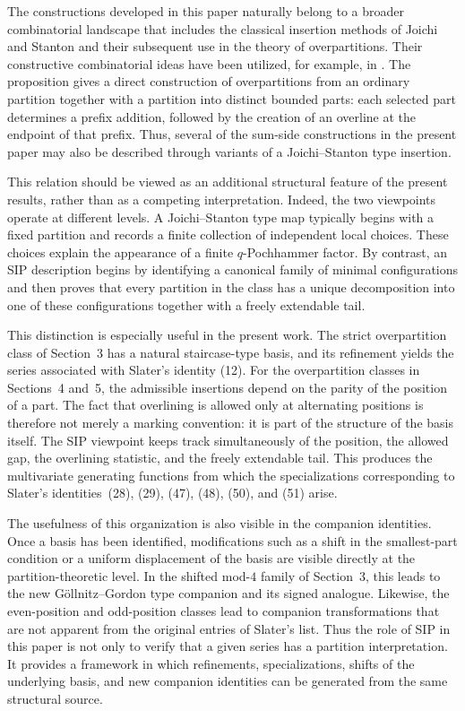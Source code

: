 \documentclass[11pt]{amsart}
\theoremstyle{definition}
\theoremstyle{remark}
\numberwithin{equation}{section}
\begin{document}
The constructions developed in this paper naturally belong to a broader combinatorial landscape that includes the classical insertion methods of Joichi and Stanton \cite{JoichiStanton1987} and their subsequent use in the theory of overpartitions. Their constructive combinatorial ideas have been utilized, for example, in \cite[Proposition~2.1]{overpartitions}. The proposition gives a direct construction of overpartitions from an ordinary partition together with a partition into distinct bounded parts: each selected part determines a prefix addition, followed by the creation of an overline at the endpoint of that prefix. Thus, several of the sum-side constructions in the present paper may also be described through variants of a Joichi--Stanton type insertion.

This relation should be viewed as an additional structural feature of the present results, rather than as a competing interpretation. Indeed, the two viewpoints operate at different levels. A Joichi--Stanton type map typically begins with a fixed partition and records a finite collection of independent local choices. These choices explain the appearance of a finite $q$-Pochhammer factor. By contrast, an SIP description begins by identifying a canonical family of minimal configurations and then proves that every partition in the class has a unique decomposition into one of these configurations together with a freely extendable tail.

This distinction is especially useful in the present work. The strict overpartition class of Section~3 has a natural staircase-type basis, and its refinement yields the series associated with Slater's identity (12). For the overpartition classes in Sections~4 and~5, the admissible insertions depend on the parity of the position of a part.  The fact that overlining is allowed only at alternating positions is therefore not merely a marking convention: it is part of the structure of the basis itself. The SIP viewpoint keeps track simultaneously of the position, the allowed gap, the overlining statistic, and the freely extendable tail. This produces the multivariate generating functions from which the specializations corresponding to Slater's identities~(28), (29), (47), (48), (50), and (51) arise.

The usefulness of this organization is also visible in the companion identities.  Once a basis has been identified, modifications such as a shift in the smallest-part condition or a uniform displacement of the basis are visible directly at the partition-theoretic level. In the shifted mod-$4$ family of Section~3, this leads to the new G\"ollnitz--Gordon type companion and its signed analogue. Likewise, the even-position and odd-position classes lead to companion transformations that are not apparent from the original entries of Slater's list. Thus the role of SIP in this paper is not only to verify that a given series has a partition interpretation. It provides a framework in which refinements, specializations, shifts of the underlying basis, and new companion identities can be generated from the same structural source.
\end{document}
